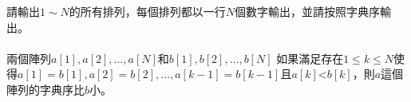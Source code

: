 請輸出$1\sim N$的所有排列，每個排列都以一行$N$個數字輸出，並請按照字典序輸出。\\
\\
兩個陣列$a[1], a[2], \ldots, a[N]$和$b[1], b[2], \ldots, b[N]$ 如果滿足存在$1\le k\le N$使得$a[1] = b[1], a[2] = b[2], \ldots, a[k - 1] = b[k - 1]$且$a[k] $<$ b[k]$，則$a$這個陣列的字典序比$b$小。\\
